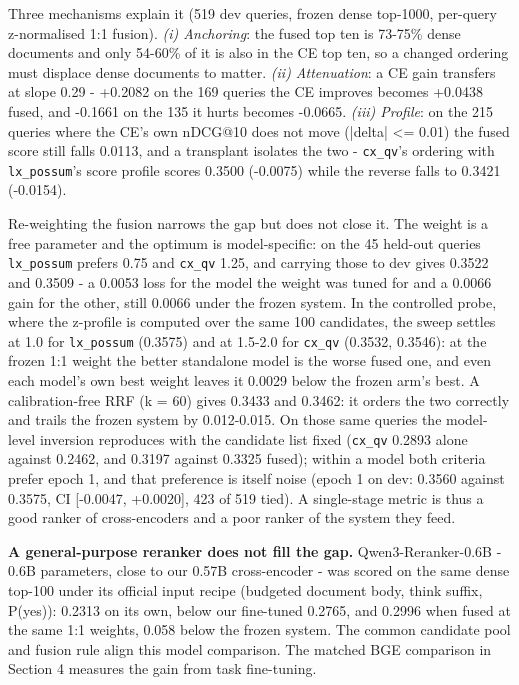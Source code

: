 \documentclass[11pt]{article}
\begin{document}
Three mechanisms explain it (519 dev queries, frozen dense top-1000, per-query z-normalised 1:1 fusion). \emph{(i) Anchoring}: the fused top ten is 73-75\% dense documents and only 54-60\% of it is also in the CE top ten, so a changed ordering must displace dense documents to matter. \emph{(ii) Attenuation}: a CE gain transfers at slope 0.29 - +0.2082 on the 169 queries the CE improves becomes +0.0438 fused, and -0.1661 on the 135 it hurts becomes -0.0665. \emph{(iii) Profile}: on the 215 queries where the CE’s own nDCG@10 does not move (|delta| <= 0.01) the fused score still falls 0.0113, and a transplant isolates the two - \texttt{cx\_qv}’s ordering with \texttt{lx\_possum}’s score profile scores 0.3500 (-0.0075) while the reverse falls to 0.3421 (-0.0154).

Re-weighting the fusion narrows the gap but does not close it. The weight is a free parameter and the optimum is model-specific: on the 45 held-out queries \texttt{lx\_possum} prefers 0.75 and \texttt{cx\_qv} 1.25, and carrying those to dev gives 0.3522 and 0.3509 - a 0.0053 loss for the model the weight was tuned for and a 0.0066 gain for the other, still 0.0066 under the frozen system. In the controlled probe, where the z-profile is computed over the same 100 candidates, the sweep settles at 1.0 for \texttt{lx\_possum} (0.3575) and at 1.5-2.0 for \texttt{cx\_qv} (0.3532, 0.3546): at the frozen 1:1 weight the better standalone model is the worse fused one, and even each model’s own best weight leaves it 0.0029 below the frozen arm’s best. A calibration-free RRF (k = 60) gives 0.3433 and 0.3462: it orders the two correctly and trails the frozen system by 0.012-0.015. On those same queries the model-level inversion reproduces with the candidate list fixed (\texttt{cx\_qv} 0.2893 alone against 0.2462, and 0.3197 against 0.3325 fused); within a model both criteria prefer epoch 1, and that preference is itself noise (epoch 1 on dev: 0.3560 against 0.3575, CI [-0.0047, +0.0020], 423 of 519 tied). A single-stage metric is thus a good ranker of cross-encoders and a poor ranker of the system they feed.

\textbf{A general-purpose reranker does not fill the gap.} Qwen3-Reranker-0.6B - 0.6B parameters, close to our 0.57B cross-encoder - was scored on the same dense top-100 under its official input recipe (budgeted document body, think suffix, P(yes)): 0.2313 on its own, below our fine-tuned 0.2765, and 0.2996 when fused at the same 1:1 weights, 0.058 below the frozen system. The common candidate pool and fusion rule align this model comparison. The matched BGE comparison in Section 4 measures the gain from task fine-tuning.
\end{document}
